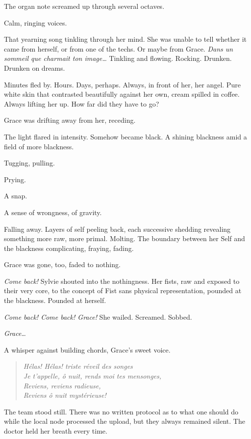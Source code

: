 \documentclass[12pt,letterpaper,oneside]{memoir}
\begin{document}
  The organ note screamed up through several octaves.

  Calm, ringing voices.

  That yearning song tinkling through her mind. She was unable to tell
  whether it came from herself, or from one of the techs. Or maybe from
  Grace. \emph{Dans un sommeil que charmait ton image\ldots{}} Tinkling
  and flowing. Rocking. Drunken. Drunken on dreams.

  Minutes fled by. Hours. Days, perhaps. Always, in front of her, her
  angel. Pure white skin that contrasted beautifully against her own,
  cream spilled in coffee. Always lifting her up. How far did they have to
  go?

  Grace was drifting away from her, receding.

  The light flared in intensity. Somehow became black. A shining blackness
  amid a field of more blackness.

  Tugging, pulling.

  Prying.

  A snap.

  A sense of wrongness, of gravity.

  Falling away. Layers of self peeling back, each successive shedding
  revealing something more raw, more primal. Molting. The boundary between
  her Self and the blackness complicating, fraying, fading.

  Grace was gone, too, faded to nothing.

  \emph{Come back!} Sylvie shouted into the nothingness. Her fists, raw
  and exposed to their very core, to the concept of Fist sans physical
  representation, pounded at the blackness. Pounded at herself.

  \emph{Come back! Come back! Grace!} She wailed. Screamed. Sobbed.

  \emph{Grace\ldots{}}

  A whisper against building chords, Grace's sweet voice.

  \begin{quote}
  \emph{H\'{e}las! H\'{e}las! triste r\'{e}veil des songes\\
  Je t'appelle, \^{o} nuit, rends moi tes mensonges,\\
  Reviens, reviens radieuse,\\
  Reviens \^{o} nuit myst\'{e}rieuse!}
  \end{quote}

  The team stood still. There was no written protocol as to what one
  should do while the local node processed the upload, but they always
  remained silent. The doctor held her breath every time.
\end{document}
